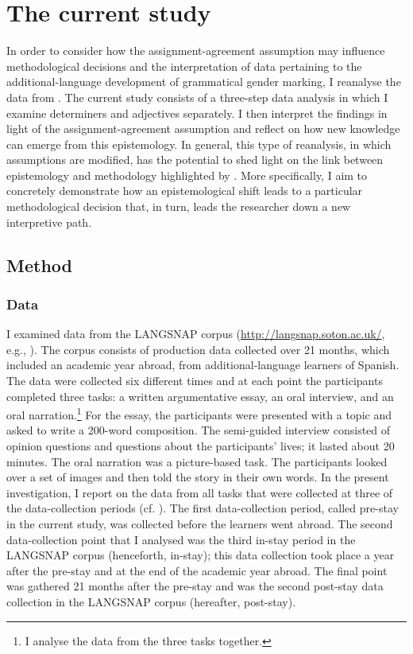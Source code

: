 \documentclass[output=paper,colorlinks,citecolor=brown,modfonts,nonflat]{../langscibook}
\begin{document}
\section{The current study}\label{sec:gudmestad:3}

In order to consider how the assignment-agreement assumption may influence methodological decisions and the interpretation of data pertaining to the additional-language development of grammatical gender marking, I reanalyse the data from \citet{GudmestadEtAl2019}. The current study consists of a three-step data analysis in which I examine determiners and adjectives separately. I then interpret the findings in light of the assignment-agreement assumption and reflect on how new knowledge can emerge from this epistemology. In general, this type of reanalysis, in which assumptions are modified, has the potential to shed light on the link between epistemology and methodology highlighted by \citet{Ortega2005}. More specifically, I aim to concretely demonstrate how an epistemological shift leads to a particular methodological decision that, in turn, leads the researcher down a new interpretive path.


\subsection{Method}\label{sec:gudmestad:3.1}

\subsubsection{Data}\label{sec:gudmestad:3.1.1}

I examined data from the LANGSNAP corpus (\url{http://langsnap.soton.ac.uk/}, e.g., \citealt{MitchellEtAl2017}). The corpus consists of production data collected over 21 months, which included an academic year abroad, from additional-language learners of Spanish. The data were collected six different times and at each point the participants completed three tasks: a written argumentative essay, an oral interview, and an oral narration.\footnote{{I analyse the data from the three tasks together.}} For the essay, the participants were presented with a topic and asked to write a 200-word composition. The semi-guided interview consisted of opinion questions and questions about the participants’ lives; it lasted about 20 minutes. The oral narration was a picture-based task. The participants looked over a set of images and then told the story in their own words. In the present investigation, I report on the data from all tasks that were collected at three of the data-collection periods (cf. \citealt{GudmestadEtAl2019}). The first data-collection period, called pre-stay in the current study, was collected before the learners went abroad. The second data-collection point that I analysed was the third in-stay period in the LANGSNAP corpus (henceforth, in-stay); this data collection took place a year after the pre-stay and at the end of the academic year abroad. The final point was gathered 21 months after the pre-stay and was the second post-stay data collection in the LANGSNAP corpus (hereafter, post-stay).
\end{document}
